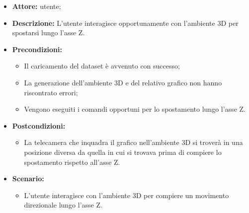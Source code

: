 \begin{itemize}    
    \item \textbf{Attore:} utente;
    \item \textbf{Descrizione:} L'utente interagisce opportunamente con l'ambiente 3D per spostarsi lungo l'asse Z.
    \item \textbf{Precondizioni:}    
        \begin{itemize}
            \item Il caricamento del dataset è avvenuto con successo;
            \item La generazione dell'ambiente 3D e del relativo grafico non hanno riscontrato errori;
            \item Vengono eseguiti i comandi opportuni per lo spostamento lungo l'asse Z.
        \end{itemize}    
    \item \textbf{Postcondizioni:}
        \begin{itemize}
            \item La telecamera che inquadra il grafico nell'ambiente 3D si troverà in una posizione diversa da quella in cui si trovava prima di compiere lo spostamento rispetto all'asse Z.
        \end{itemize}    
    \item \textbf{Scenario:} 
        \begin{itemize}
            \item L'utente interagisce con l'ambiente 3D per compiere un movimento direzionale lungo l'asse Z.
        \end{itemize}
\end{itemize}



